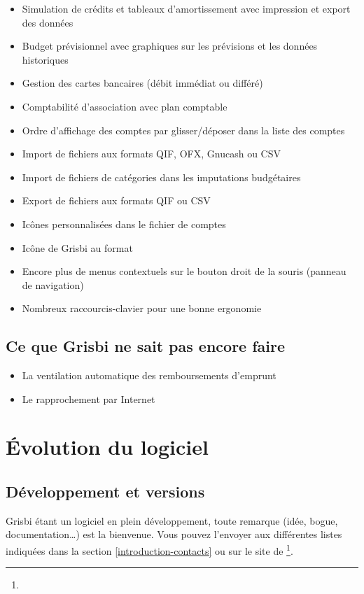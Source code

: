 \begin{itemize}
	\item Simulation de crédits et tableaux d'amortissement avec impression et export des données
	\item Budget prévisionnel avec graphiques sur les prévisions et les données historiques
	\item Gestion des cartes bancaires (débit immédiat ou différé)
	\item Comptabilité d'association avec plan comptable
	\item Ordre d'affichage des comptes par glisser/déposer dans la liste des comptes
	\item Import de fichiers aux formats \gls{QIF}, \gls{OFX}, \gls{Gnucash} ou \gls{CSV}
	\item Import de fichiers de catégories dans les imputations budgétaires
	\item Export de fichiers aux formats \gls{QIF} ou \gls{CSV}
	\item Icônes personnalisées dans le fichier de comptes
	\item Icône de Grisbi au format 
	\item Encore plus de menus contextuels sur le bouton droit de la souris (panneau de navigation)
	\item Nombreux raccourcis-clavier pour une bonne ergonomie
\end{itemize}


\subsection{Ce que Grisbi ne sait pas encore faire}

\begin{itemize}
	\item La ventilation automatique des remboursements d'emprunt
	\item Le rapprochement par Internet
\end{itemize}


\section{Évolution du logiciel}


\subsection{Développement et versions}

Grisbi étant un logiciel en plein développement, toute remarque (idée,
bogue, documentation\dots) est la bienvenue. Vous pouvez l'envoyer aux différentes listes indiquées dans la section \vref{introduction-contacts}  ou sur le site de \footnote{\urlGrisbi{}}.

